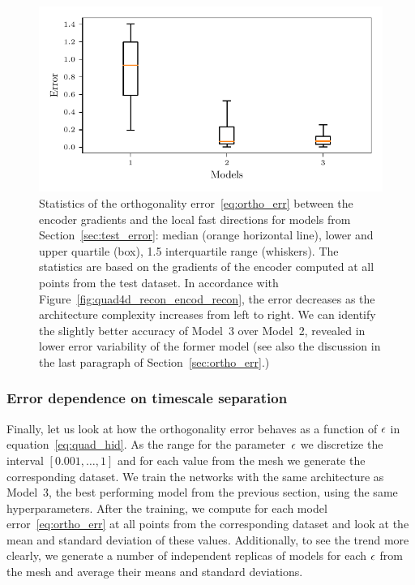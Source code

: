 \documentclass{article}
\begin{document}
\begin{figure}
    \centering
    \includegraphics[]{figs/quad4d_enc_err_derivatives.pdf}
    \caption{Statistics of the orthogonality error~\eqref{eq:ortho_err} between the encoder gradients and the local fast directions for models from Section~\ref{sec:test_error}: median (orange horizontal line), lower and upper quartile (box), 1.5 interquartile range (whiskers). The statistics are based on the gradients of the encoder computed at all points from the test dataset. In accordance with Figure~\ref{fig:quad4d_recon_encod_recon}, the error decreases as the architecture complexity increases from left to right. We can identify the slightly better accuracy of Model~3 over Model~2, revealed in lower error variability of the former model (see also the discussion in the last paragraph of Section~\ref{sec:ortho_err}.)
    }
    \label{fig:quad4d_enc_err_derivatives}
\end{figure}

\subsubsection{Error dependence on timescale separation}
\label{sec:err_vs_eps}

Finally, let us look at how the orthogonality error behaves as a function of $\epsilon$ in equation~\eqref{eq:quad_hid}. As the range for the parameter~$\epsilon$ we discretize the interval $[0.001,\dotsc,1]$ and for each value from the mesh we generate the corresponding dataset. We train the networks with the same architecture as Model~3, the best performing model from the previous section, using the same hyperparameters. After the training, we compute for each model error~\eqref{eq:ortho_err} at all points from the corresponding dataset and look at the mean and standard deviation of these values. Additionally, to see the trend more clearly, we generate a number of independent replicas of models for each $\epsilon$ from the mesh and average their means and standard deviations.
\end{document}
